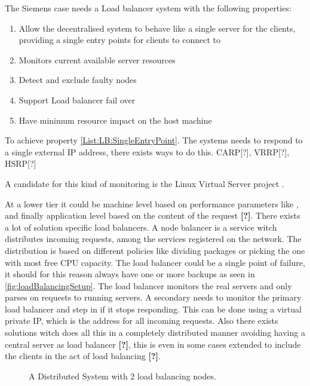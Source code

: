 The Siemens case needs a Load balancer system with the following properties:
\begin{enumerate}[label=\textbf{P.\arabic*}, ref=\textit{P.\arabic*}]
	\item \label{List:LB:SingleEntryPoint}Allow the decentralised system to behave like a single server for the clients, providing a single entry points for clients to connect to
	\item Monitors current available server resources
	\item Detect and exclude faulty nodes 
	\item Support Load balancer fail over
	\item Have minimum resource impact on the host machine
\end{enumerate}


To achieve property \ref{List:LB:SingleEntryPoint}.
The systems needs to respond to a single external IP address, there exists ways to do this.
CARP[?], VRRP[?], HSRP[?]


A candidate for this kind of monitoring is the Linux Virtual Server project \cite{zhang2000linuxVirtualServer}.



At a lower tier it could be machine level based on performance parameters like , and finally application level based on the content of the request \textbf{[?]}. %
There exists a lot of solution specific load balancers.
A node balancer is a service witch distributes incoming requests, among the services registered on the network.
The distribution is based on different policies like dividing packages or picking the one with most free CPU capacity.
The load balancer could be a single point of failure, it should for this reason always have one or more backups as seen in \cref{fig:loadBalancingSetup}.
The load balancer monitors the real servers and only parses on requests to running servers.
A secondary needs to monitor the primary load balancer and step in if it stops responding.
This can be done using a virtual private IP, which is the address for all incoming requests. Also there exists solutions witch does all this in a completely distributed manner avoiding having a central server as load balancer  \textbf{[?]}, %
this is even in some cases extended to include the clients in the act of load balancing \textbf{[?]}. %

\begin{figure}
	\centering	
	\scalebox{0.7}{}
	\caption[Distributed System with 2 load balancing nodes]{
		\label{fig:loadBalancingSetup2Balancers} 
		\footnotesize{%
			A Distributed System with 2 load balancing nodes.
		}
	}
\end{figure}

